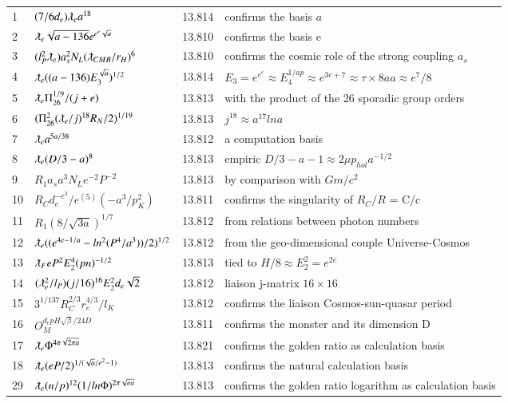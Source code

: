 \documentclass[a4paper,9pt]{article}
\begin{document}
\begin{appendix}
\begin{table}
\begin{tabular}{llll}
   1 & $ (7/6d_e) \lambdabar_{e} a^{18} $ & 13.814 & confirms the basis $a$ \\
   2 & $ \lambdabar_{e} \sqrt{a -136} e^{e^e \sqrt a}$ & 13.810 & confirms the basis e \\
   3 & $(l_P^2 \lambdabar_{e})a_s^2 N_L (\lambdabar_{CMB}/r_H)^6$ & 13.810 & confirms the cosmic role of the strong coupling $a_s$ \\
   4 & $\lambdabar_{e} ((a-136)E_3^{\sqrt a})^{1/2}$ & 13.814 & $E_3 = e^{e^e} \approx E_4^{1/ap} \approx e^{3e+7}\approx \tau \times 8a a\approx e^7/8$ \\
   5 & $\lambdabar_{e} \Pi_{26}^{1/9}/(j+e)$ & 13.813 & with the product of the 26 sporadic group orders\\
   6 & $(\Pi_{26}^2(\lambdabar_e/j)^{18}R_N/2)^{1/19}$ & 13.813 & $j^{18} \approx a^{17} lna$\\
   7 & $\lambdabar_{e} a^{5a/38}$ & 13.812 & a computation basis\\
  8 & $\lambdabar_{e} (D/3 - a)^8$ & 13.813 & empiric $D/3 -a -1 \approx 2\mu p_{hol}a^{-1/2}$\\ 
   9 & $R_1 a_s a^3 N_L e^{-2}P^{-2}$ & 13.813 & by comparison with $Gm/c^2$\\
   10 & $R_C d_e^{-e^3}/e^{(5)}(-a^3/p_K^2)$ & 13.811 & confirms the singularity of $R_C/R$ = C/c\\
   11 & $R_1 (8/\sqrt{3a})^{1/7}$ & 13.812 & from relations between photon numbers \\
   12 & $\lambdabar_{e} ((e^{4e-1/a} - ln^2(P^4/a^3))/2)^{1/2}$ & 13.812 & from the geo-dimensional couple Universe-Cosmos\\
   13 & $\lambdabar_{F} e P^2E_2^4(pn)^{-1/2}$ & 13.813 &tied to $H/8 \approx E_2^2 = e^{2e}$\\
   14 & $(\lambdabar_{e}^2/l_P) (j/16)^{16}E_2^2 d_e \sqrt 2$ & 13.812 & liaison j-matrix $16 \times 16$\\
   15 & $3^{1/137} R_{C}^{2/3} r_e^{4/3} /l_K$ & 13.812 & confirms the liaison Cosmos-sun-quasar period\\
   16 & $O_M^{d_e pH\sqrt\beta / 24D}$ & 13.811 & confirms the monster and its dimension D\\
      17 & $\lambdabar_{e} \Phi ^{4\pi\sqrt{2\pi a}} $ & 13.821 & confirms the golden ratio as calculation basis\\
     18 & $\lambdabar_{e} (eP/2)^{1/(\sqrt a/e^2 - 1)} $ & 13.813 & confirms the natural calculation basis\\
    29 & $\lambdabar_{e} (n/p)^{12} (1/ln{\Phi}) ^{2\pi\sqrt{e a}} $ & 13.813 & confirms the golden ratio logarithm as calculation basis\\

\end{tabular}
\end{table}
\end{appendix}
\end{document}
